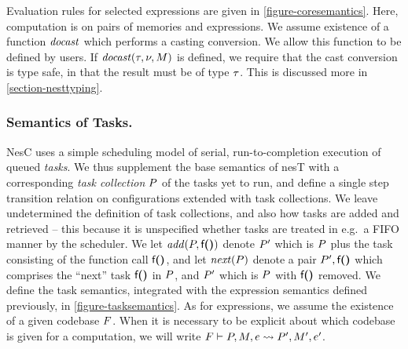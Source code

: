Evaluation rules for selected expressions are given in
\autoref{figure-coresemantics}. Here, computation is on pairs of
memories and expressions. 
We assume existence of a function $\mathit{docast}$ which performs a
casting conversion. We allow this function to be defined by users.
If $\mathit{docast}(\tau,{\nu},M)$ is defined, we require that the cast
conversion is type safe, in that the result must be of type $\tau$.
This is discussed more in \autoref{section-nesttyping}. 


\subsubsection{Semantics of Tasks.}  NesC uses a simple scheduling model 
of serial, run-to-completion execution of queued \emph{tasks}. We thus
supplement the base semantics of nesT with a corresponding \emph{task
  collection} $P$ of the tasks yet to run, and define a
single step transition relation on configurations extended with task
collections.  We leave undetermined the definition of task
collections, and also how tasks are added and retrieved -- this
because it is unspecified whether tasks are treated in e.g.~a FIFO
manner by the scheduler.  We let $\mathit{add}(P,\textsf{f}\textbf{(}\textbf{)})$ denote
$P'$ which is $P$ plus the task consisting of the function
call $\textsf{f}\textbf{(}\textbf{)}$, and let $\mathit{next}(P)$ denote a pair
$P',\textsf{f}\textbf{(}\textbf{)}$ which comprises the ``next'' task
$\textsf{f}\textbf{(}\textbf{)}$ in $P$, and $P'$ which is $P$ with
$\textsf{f}\textbf{(}\textbf{)}$ removed.  We define the task semantics, integrated
with the expression semantics defined previously, in
\autoref{figure-tasksemantics}. As for expressions, we assume the
existence of a given codebase $F$. When it is necessary to be
explicit about which codebase is given for a computation, we will
write $F \vdash P, M, e \leadsto P', M', e'$.

